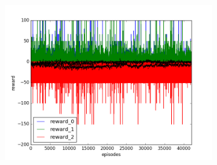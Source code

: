 \begin{figure}[t]
\begin{subfigure}[t]{\figscale\linewidth}
    \includegraphics[width=1.5\textwidth]
    {../results/maddpg_1vs2/reward.png}
    \label{fig:maddpg-1vs2-reward}
  \end{subfigure}


\end{figure}

